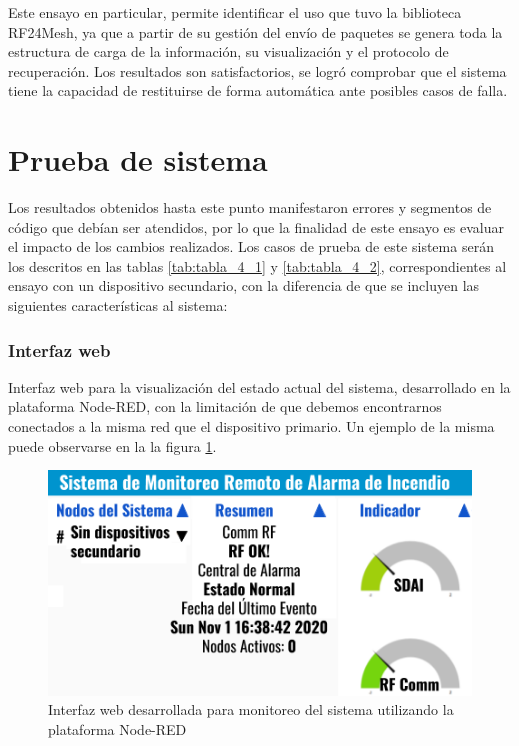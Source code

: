 Este ensayo en particular, permite identificar el uso que tuvo la biblioteca RF24Mesh, ya que a partir de su gestión del envío de paquetes se genera toda la estructura de carga de la información, su visualización y el protocolo de recuperación. Los resultados son satisfactorios, se logró comprobar que el sistema tiene la capacidad de restituirse de forma automática ante posibles casos de falla.


\section{Prueba de sistema}


Los resultados obtenidos hasta este punto manifestaron errores y segmentos de código que debían ser atendidos, por lo que la finalidad de este ensayo es evaluar el impacto de los cambios realizados. Los casos de prueba de este sistema serán los descritos en las tablas \ref{tab:tabla_4_1} y \ref{tab:tabla_4_2}, correspondientes al ensayo con un dispositivo secundario, con la diferencia de que se incluyen las siguientes características al sistema: 

\subsubsection{Interfaz web}
Interfaz web para la visualización del estado actual del sistema, desarrollado en la plataforma Node-RED, con la limitación de que debemos encontrarnos conectados a la misma red que el dispositivo primario. Un ejemplo de la misma puede observarse en la la figura \ref{fig:figura_m}.


\begin{figure}[ht]
	\centering
	\includegraphics[scale=.55]{./Figures/Capitulo4/Figura_M.png}
	\caption{Interfaz web desarrollada para monitoreo del sistema utilizando la plataforma Node-RED}
	\label{fig:figura_m}
\end{figure}

